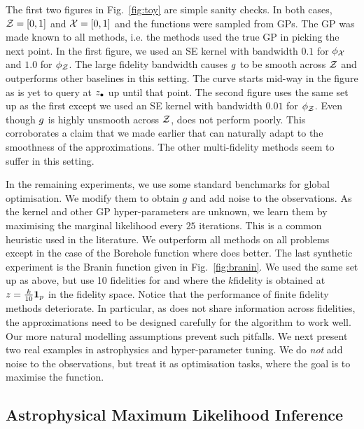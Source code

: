 The first two figures in Fig.~\ref{fig:toy} are simple sanity checks.
In both cases, $\mathcal{Z}=[0,1]$ and $\mathcal{X}=[0,1]$ and the functions were sampled from GPs. 
The GP was made known to all methods, i.e. the methods used the true GP in picking the
next point.
In the first figure, we used an SE kernel with bandwidth $0.1$ for $\phi_{\mathcal{X}}$ and
$1.0$ for $\phi_{\mathcal{Z}}$.
The large fidelity bandwidth causes $g$ to be smooth across $\mathcal{Z}$ and
\mfgpucbtwos outperforms other baselines in this setting.
The curve starts mid-way in the figure as \bocas is yet to query at $z_{\bullet}$ up until
that point.
The second figure uses the same set up as the first except we used an SE
kernel with bandwidth $0.01$ for $\phi_{\mathcal{Z}}$.
Even though $g$ is highly  unsmooth across $\mathcal{Z}$,
\mfgpucbtwos does not perform poorly.
This corroborates a claim that we made earlier that \bocas can naturally adapt
to the smoothness of the approximations.
The other multi-fidelity methods seem to suffer in this setting.



In the remaining experiments, we use some standard benchmarks for global optimisation.
We modify them to obtain $g$ and add noise to the observations.
As the kernel and other GP hyper-parameters are unknown, we learn them by maximising
the marginal likelihood every $25$ iterations.
This is a common heuristic used in the \bayo{} literature.
We outperform all methods on all problems
except in the case of the Borehole function where \mfgpucbones does better.
The last synthetic experiment is the Branin function given in Fig.~\ref{fig:branin}.
We used the same set up as above, but use 10 fidelities for \mfgpucbones and \mfskos
where the $k$\ssth fidelity is obtained at $z = \frac{k}{10}{\bf 1}_p$ in the fidelity space.
Notice that the performance of finite fidelity methods deteriorate.
In particular, as \mfgpucbones does not share information across fidelities, the
approximations need to be designed carefully for the algorithm to work well.
Our more natural modelling assumptions prevent such pitfalls.
We next present two real examples in astrophysics and hyper-parameter tuning.
We do \emph{not} add noise to the observations, but treat it as optimisation tasks,
where the goal is to maximise the function.

\subsection{Astrophysical Maximum Likelihood Inference}

